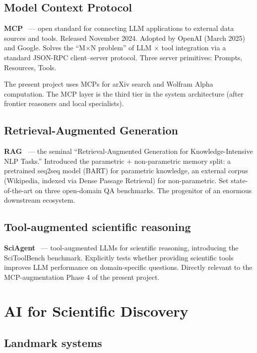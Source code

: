 \documentclass[11pt]{article}
\begin{document}
\subsection{Model Context Protocol}

\textbf{MCP}~\cite{anthropic2024mcp} --- open standard for connecting LLM applications to external data sources and tools. Released November 2024. Adopted by OpenAI (March 2025) and Google. Solves the ``M$\times$N problem'' of LLM $\times$ tool integration via a standard JSON-RPC client--server protocol. Three server primitives: Prompts, Resources, Tools.

The present project uses MCPs for arXiv search and Wolfram Alpha computation. The MCP layer is the third tier in the system architecture (after frontier reasoners and local specialists).

\subsection{Retrieval-Augmented Generation}

\textbf{RAG}~\cite{lewis2020rag} --- the seminal ``Retrieval-Augmented Generation for Knowledge-Intensive NLP Tasks.'' Introduced the parametric $+$ non-parametric memory split: a pretrained seq2seq model (BART) for parametric knowledge, an external corpus (Wikipedia, indexed via Dense Passage Retrieval) for non-parametric. Set state-of-the-art on three open-domain QA benchmarks. The progenitor of an enormous downstream ecosystem.

\subsection{Tool-augmented scientific reasoning}

\textbf{SciAgent}~\cite{ma2024sciagent} --- tool-augmented LLMs for scientific reasoning, introducing the SciToolBench benchmark. Explicitly tests whether providing scientific tools improves LLM performance on domain-specific questions. Directly relevant to the MCP-augmentation Phase 4 of the present project.

\section{AI for Scientific Discovery}

\subsection{Landmark systems}
\end{document}
